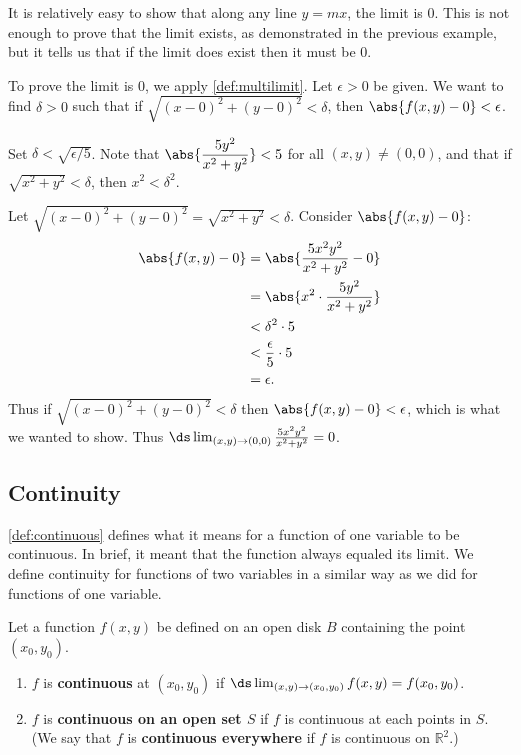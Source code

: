 {It is relatively easy to show that along any line $y=mx$, the limit is 0. This is not enough to prove that the limit exists, as demonstrated in the previous example, but it tells us that if the limit does exist then it must be 0.

To prove the limit is 0, we apply \autoref{def:multilimit}. Let $\epsilon >0$ be given. We want to find $\delta >0$ such that if $\sqrt{(x-0)^2+(y-0)^2} <\delta$, then $\abs{f(x,y)-0}<\epsilon$.

Set $\delta < \sqrt{\epsilon/5}$. Note that $\abs{\dfrac{5y^2}{x^2+y^2}}<5$ for all $(x,y)\neq (0,0)$, and that if $\sqrt{x^2+y^2} <\delta$, then $x^2<\delta^2$.

Let $\sqrt{(x-0)^2+(y-0)^2} = \sqrt{x^2+y^2}<\delta$. Consider $\abs{f(x,y)-0}$:
\begin{align*}
\abs{f(x,y)-0}&= \abs{\frac{5x^2y^2}{x^2+y^2}-0} \\
				&= \abs{x^2\cdot\frac{5y^2}{x^2+y^2}}\\
				&< \delta^2\cdot 5 \\
				&< \frac{\epsilon}{5}\cdot 5 \\
				&= \epsilon.
\end{align*}
Thus if $\sqrt{(x-0)^2+(y-0)^2}<\delta$ then $\abs{f(x,y)-0}<\epsilon$, which is what we wanted to show. Thus $\ds \lim_{(x,y)\to(0,0)} \frac{5x^2y^2}{x^2+y^2} = 0$.}

\subsection*{Continuity}

\autoref{def:continuous} defines what it means for a function of one variable to be continuous. In brief, it meant that the function always equaled its limit. We define continuity for functions of two variables in a similar way as we did for functions of one variable.

{Let a function $f(x,y)$ be defined on an open disk $B$ containing the point $(x_0,y_0)$. 

\begin{enumerate}
	\item $f$ is \textbf{continuous} at $(x_0,y_0)$ if $\ds\lim_{(x,y)\to(x_0,y_0)} f(x,y) = f(x_0,y_0)$.
	\item	$f$ is \textbf{continuous on an open set $S$} if $f$ is continuous at each points in $S$. (We say that $f$ is \textbf{continuous everywhere} if $f$ is continuous on $\mathbb{R}^2$.)
\end{enumerate}}

